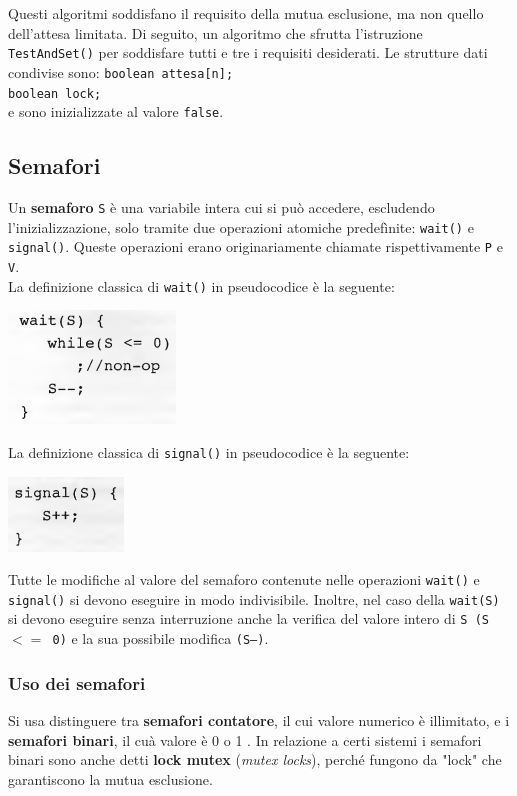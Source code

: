 \documentclass[11pt,a4paper]{article}
\begin{document}
Questi algoritmi soddisfano il requisito della mutua esclusione, ma non quello dell'atte­sa limitata.
Di seguito, un algoritmo che sfrutta l'istruzione \texttt{TestAndSet()}
per soddisfare tutti e tre i requisiti desiderati. Le strutture dati condivise sono:
\texttt{boolean attesa[n];}\\
\texttt{boolean lock;}\\
e sono inizializzate al valore \texttt{false}.

\subsection{Semafori}
Un \textbf{semaforo} \texttt{S} è una variabile intera cui si può accedere, escludendo l'inizializzazione,
solo tramite due operazioni atomiche predefìnite: \texttt{wait()} e \texttt{signal()}. Queste operazioni
erano originariamente chiamate rispettivamente \texttt{P} e \texttt{V}.\\
La definizione classica di \texttt{wait()} in pseudocodice
è la seguente:
\begin{center}
  \includegraphics[scale=0.6]{img/0028.png}
\end{center}
La definizione classica di \texttt{signal()} in pseudocodice è la seguente:
\begin{center}
  \includegraphics[scale=0.6]{img/0029.png}
\end{center}

Tutte le modifiche al valore del semaforo contenute nelle operazioni \texttt{wait()} e \texttt{signal()}
si devono eseguire in modo indivisibile. Inoltre, nel
caso della \texttt{wait(S)} si devono eseguire senza interruzione anche la verifica del valore intero
di \texttt{S (S $<=$ 0)} e la sua possibile modifica \texttt{(S--)}.

\subsubsection{Uso dei semafori}
Si usa distinguere tra \textbf{semafori contatore}, il cui valore numerico è illimitato, e i \textbf{semafori bi­nari}, il cuà valore è 0 o 1 . In relazione a certi sistemi i semafori binari sono anche detti \textbf{lock mutex} (\emph{mutex locks}), perché fungono da "lock" che garantiscono la mutua esclusione.
\end{document}

